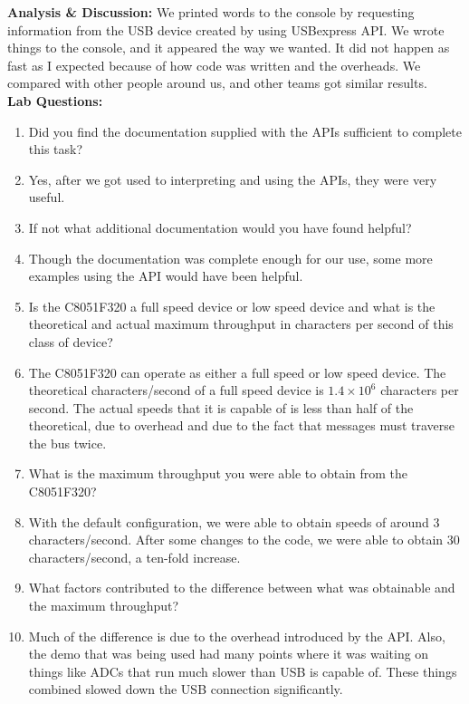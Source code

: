 \documentclass{article}
\newcommand{\Q}{\textbf{Q:}}
\newcommand{\A}{\textbf{A:}}
\newcommand{\sect}[1]{\noindent\textbf{#1}}
\begin{document}
\sect{Analysis \& Discussion:} We printed words to the console by requesting information from the USB device created by using USBexpress API. We wrote things to the console, and it appeared the way we wanted. It did not happen as fast as I expected because of how code was written and the overheads. We compared with other people around us, and other teams got similar results.\\

\sect{Lab Questions:}

\begin{enumerate}
	\item[\Q] Did you find the documentation supplied with the APIs sufficient to complete this task?
	\item[\A] Yes, after we got used to interpreting and using the APIs, they were very useful.
	\item[\Q]If not what additional documentation would you have found helpful?
	\item[\A] Though the documentation was complete enough for our use, some more examples using the API would have been helpful.
	\item[\Q] Is the C8051F320 a full speed device or low speed device and what is the theoretical and actual maximum throughput in characters per second of this class of device?
	\item[\A] The C8051F320 can operate as either a full speed or low speed device. The theoretical characters/second of a full speed device is $1.4\times 10^6$ characters per second. The actual speeds that it is capable of is less than half of the theoretical, due to overhead and due to the fact that messages must traverse the bus twice.
	\item[\Q] What is the maximum throughput you were able to obtain from the C8051F320?
	\item[\A] With the default configuration, we were able to obtain speeds of around 3 characters/second. After some changes to the code, we were able to obtain 30 characters/second, a ten-fold increase.
	\item[\Q] What factors contributed to the difference between what was obtainable and the maximum throughput?
	\item[\A] Much of the difference is due to the overhead introduced by the API. Also, the demo that was being used had many points where it was waiting on things like ADCs that run much slower than USB is capable of. These things combined slowed down the USB connection significantly.
\end{enumerate}~
\end{document}
